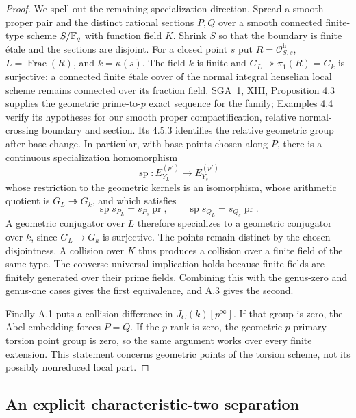\begin{proof}
We spell out the remaining specialization direction. Spread a
smooth proper pair and the distinct rational sections $P,Q$ over
a smooth connected finite-type scheme $S/\mathbb F_q$ with function
field $K$. Shrink $S$ so that the boundary is finite \'etale and
the sections are disjoint. For a closed point $s$ put
$R=\mathcal O_{S,s}^{\mathrm h}$, $L=\operatorname{Frac}(R)$,
and $k=\kappa(s)$. The field $k$ is finite and
$G_L\twoheadrightarrow\pi_1(R)=G_k$ is surjective: a connected
finite \'etale cover of the normal integral henselian local
scheme remains connected over its fraction field.
SGA~1, XIII, Proposition 4.3 supplies the geometric
prime-to-$p$ exact sequence for the family; Examples 4.4 verify
its hypotheses for our smooth proper compactification, relative
normal-crossing boundary and section. Its 4.5.3 identifies the
relative geometric group after base change. In particular,
with base points chosen along $P$, there is a continuous
specialization homomorphism
\[
 \operatorname{sp}:E_{Y_L}^{(p')}\longrightarrow E_{Y_s}^{(p')}
\]
whose restriction to the geometric kernels is an isomorphism,
whose arithmetic quotient is $G_L\twoheadrightarrow G_k$, and
which satisfies
\[
 \operatorname{sp}s_{P_L}=s_{P_s}\operatorname{pr},\qquad
 \operatorname{sp}s_{Q_L}=s_{Q_s}\operatorname{pr}.
\]
A geometric conjugator over $L$ therefore specializes to a
geometric conjugator over $k$, since $G_L\to G_k$ is surjective.
The points remain distinct by the chosen disjointness. A collision
over $K$ thus produces a collision over a finite field of the same
type. The converse universal implication holds because finite
fields are finitely generated over their prime fields.
Combining this with the genus-zero and genus-one cases gives the
first equivalence, and A.3 gives the second.

Finally A.1 puts a collision difference in $J_C(k)[p^\infty]$.
If that group is zero, the Abel embedding forces $P=Q$. If the
$p$-rank is zero, the geometric $p$-primary torsion point group
is zero, so the same argument works over every finite extension.
This statement concerns geometric points of the torsion scheme,
not its possibly nonreduced local part.
\end{proof}

\subsection{An explicit characteristic-two separation}

